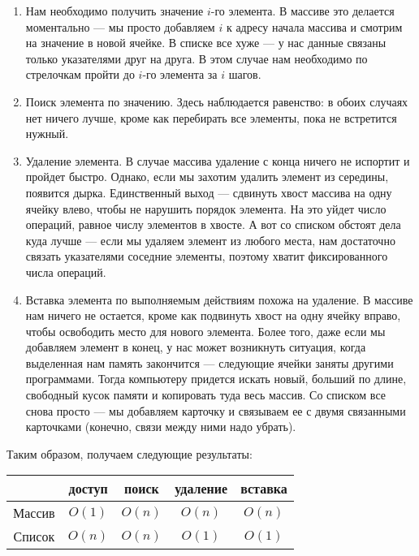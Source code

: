 \begin{enumerate}
    \item Нам необходимо получить значение $i$-го элемента. В массиве это
        делается моментально --- мы просто добавляем $i$ к адресу начала
        массива и смотрим на значение в новой ячейке. В списке все хуже
        --- у нас данные связаны только указателями друг на друга.
        В этом случае нам необходимо по стрелочкам пройти до $i$-го
        элемента за $i$ шагов. 
    \item Поиск элемента по значению. Здесь наблюдается равенство: в обоих
        случаях нет ничего лучше, кроме как перебирать все элементы, пока
        не встретится нужный.
    \item Удаление элемента. В случае массива удаление с конца ничего не
        испортит и пройдет быстро. Однако, если мы захотим удалить элемент
        из середины, появится дырка. Единственный выход --- сдвинуть
        хвост массива на одну ячейку влево, чтобы не нарушить порядок
        элемента. На это уйдет число операций, равное числу элементов в
        хвосте. А вот со списком обстоят дела куда лучше --- если мы
        удаляем элемент из любого места, нам достаточно связать указателями
        соседние элементы, поэтому хватит фиксированного числа операций.
    \item Вставка элемента по выполняемым действиям похожа на удаление.
        В массиве нам ничего не остается, кроме как подвинуть хвост на
        одну ячейку вправо, чтобы освободить место для нового элемента.
        Более того, даже если мы добавляем элемент в конец, у нас может
        возникнуть ситуация, когда выделенная нам память закончится ---
        следующие ячейки заняты другими программами. Тогда компьютеру
        придется искать новый, больший по длине, свободный кусок памяти
        и копировать туда весь массив. Со списком все снова просто --- мы
        добавляем карточку и связываем ее с двумя связанными карточками
        (конечно, связи между ними надо убрать).
\end{enumerate}

Таким образом, получаем следующие результаты:
\begin{center}
    \begin{tabular}{c||c|c|c|c}
            & доступ & поиск & удаление & вставка \\
         \hline \hline
        Массив & $O(1)$ & $O(n)$ & $O(n)$ & $O(n)$ \\
        \hline
        Список & $O(n)$ & $O(n)$ & $O(1)$ & $O(1)$
    \end{tabular}
\end{center}

